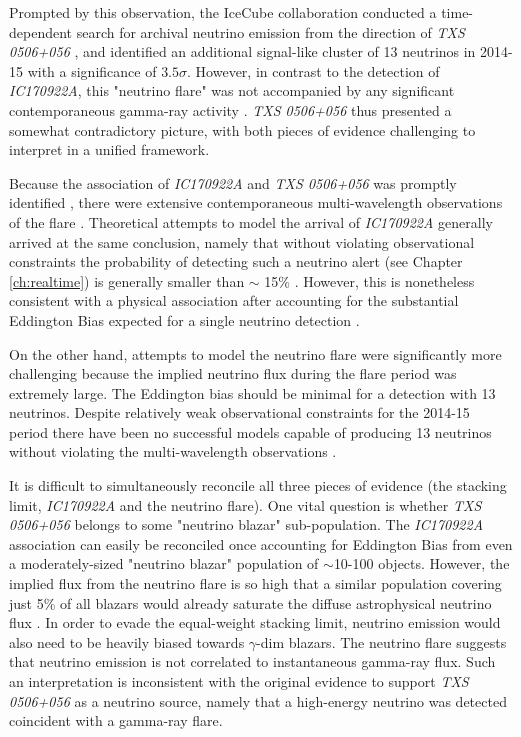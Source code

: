 Prompted by this observation, the IceCube collaboration conducted a time-dependent search for archival neutrino emission from the direction of \emph{TXS 0506+056} , and identified an additional signal-like cluster of 13 neutrinos in 2014-15 with a significance of $3.5 \sigma$. However, in contrast to the detection of \emph{IC170922A}, this "neutrino flare" was not accompanied by any significant contemporaneous gamma-ray activity . \emph{TXS 0506+056} thus presented a somewhat contradictory picture, with both pieces of evidence challenging to interpret in a unified framework. 

Because the association of \emph{IC170922A} and \emph{TXS 0506+056} was promptly identified , there were extensive contemporaneous multi-wavelength observations of the flare \cite{ic_txs_mm_18}. Theoretical attempts to model the arrival of \emph{IC170922A} generally arrived at the same conclusion, namely that without violating observational constraints the probability of detecting such a neutrino alert (see Chapter \ref{ch:realtime}) is generally smaller than $\sim$ 15\% . However, this is nonetheless consistent with a physical association after accounting for the substantial Eddington Bias expected for a single neutrino detection .

On the other hand, attempts to model the neutrino flare were significantly more challenging because the implied neutrino flux during the flare period was extremely large. The Eddington bias should be minimal for a detection with 13 neutrinos. Despite relatively weak observational constraints for the 2014-15 period there have been no successful models capable of producing 13 neutrinos without violating the multi-wavelength observations .

It is difficult to simultaneously reconcile all three pieces of evidence (the stacking limit, \emph{IC170922A} and the neutrino flare). One vital question is whether \emph{TXS 0506+056} belongs to some "neutrino blazar" sub-population. The \emph{IC170922A} association can easily be reconciled once accounting for Eddington Bias from even a moderately-sized "neutrino blazar" population of $\sim$10-100 objects. However, the implied flux from the neutrino flare is so high that a similar population covering just 5\% of all blazars would already saturate the diffuse astrophysical neutrino flux . In order to evade the equal-weight stacking limit, neutrino emission would also need to be heavily biased towards $\gamma$-dim blazars. The neutrino flare suggests that neutrino emission is not correlated to instantaneous gamma-ray flux. Such an interpretation is inconsistent with the original evidence to support \emph{TXS 0506+056} as a neutrino source, namely that a high-energy neutrino was detected coincident with a gamma-ray flare.

